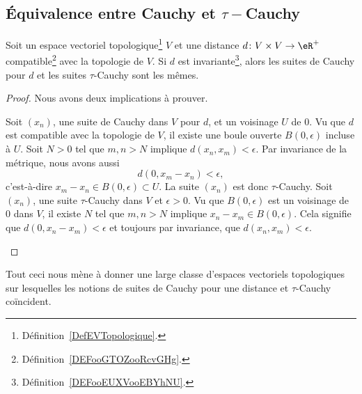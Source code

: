 \subsection{Équivalence entre Cauchy et \texorpdfstring{\( \tau-\)}{tau-}Cauchy}

\begin{lemma}       \label{LEMooIAHSooFkXjvr}
	Soit un espace vectoriel topologique\footnote{Définition~\ref{DefEVTopologique}.} \( V\) et une distance \( d\colon V\times V\to \eR^+\) compatible\footnote{Définition~\ref{DEFooGTOZooRcvGHg}.} avec la topologie de \( V\). Si \( d\) est invariante\footnote{Définition~\ref{DEFooEUXVooEBYhNU}.}, alors les suites de Cauchy pour \( d \) et les suites \( \tau\)-Cauchy sont les mêmes.
\end{lemma}

\begin{proof}
	Nous avons deux implications à prouver.
	\begin{subproof}
		Soit \( (x_n)\), une suite de Cauchy dans \( V\) pour \( d\), et un voisinage \( U\) de \( 0\). Vu que \( d\) est compatible avec la topologie de \( V\), il existe une boule ouverte \( B(0,\epsilon)\) incluse à \( U\). Soit \( N>0\) tel que \( m,n>N\) implique \( d(x_n,x_m)<\epsilon\). Par invariance de la métrique, nous avons aussi
		\begin{equation}
			d(0,x_m-x_n)<\epsilon,
		\end{equation}
		c'est-à-dire \( x_m-x_n\in B(0,\epsilon)\subset U\). La suite \( (x_n)\) est donc \( \tau\)-Cauchy.
		Soit \( (x_n)\), une suite \( \tau\)-Cauchy dans \( V\) et \( \epsilon>0\). Vu que \( B(0,\epsilon)\) est un voisinage de \( 0\) dans \( V\), il existe \( N\) tel que \( m,n>N\) implique \( x_n-x_m\in B(0,\epsilon)\). Cela signifie que \( d(0,x_n-x_m)<\epsilon\) et toujours par invariance, que \( d(x_n,x_m)<\epsilon\).
	\end{subproof}
\end{proof}

Tout ceci nous mène à donner une large classe d'espaces vectoriels topologiques sur lesquelles les notions de suites de Cauchy pour une distance et \( \tau\)-Cauchy coïncident.

